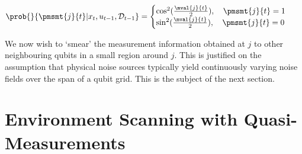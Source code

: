 \begin{align}
\prob{}{\pmsmt{j}{t} | x_t, u_{t-1}, \mathcal{D}_{t-1}} & = \begin{cases}
\cos^2(\frac{\mval{j}{t}}{2}), \quad \pmsmt{j}{t}=1 \\
\sin^2(\frac{\mval{j}{t}}{2}), \quad \pmsmt{j}{t}=0 \\
\end{cases} \label{eqn:born_singlequbit}
\end{align}

We now wish to `smear' the measurement information obtained at $j$ to other neighbouring qubits in a small region around $j$. This is justified on the assumption that physical noise sources typically yield continuously varying noise fields over the span of a qubit grid. This is the subject of the next section.

\section{Environment Scanning with Quasi-Measurements} \label{sec:quasimsmtscan}

